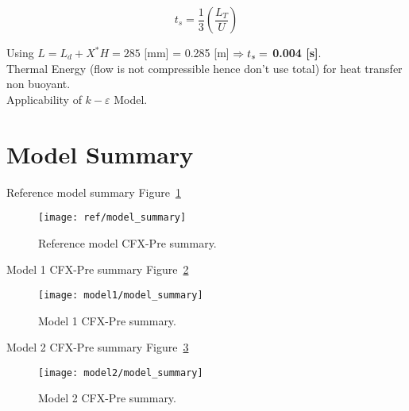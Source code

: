 \begin{equation}
	\label{eq:ts}
	t_s = \frac{1}{3} \left( \frac{L_T}{U} \right)
\end{equation}

Using $L = L_d + X^* H = 285$ [mm] = 0.285 [m] $\Rightarrow \boldmath{t_s =}$ \textbf{0.004 [s]}.\\  

Thermal Energy (flow is not compressible hence don't use total) for heat transfer non buoyant.\\


Applicability of $k-\varepsilon$ Model.


\section{Model Summary}
\label{sec:pre_summary}

Reference model summary Figure~\ref{fig:ref_modsum}
\begin{figure}[H]
	\centering
	\texttt{[image: ref/model\_summary]}
	\caption{Reference model CFX-Pre summary.}
	\label{fig:ref_modsum}
\end{figure}


Model 1 CFX-Pre summary Figure~\ref{fig:mod1_modsum}
\begin{figure}[H]
	\centering
	\texttt{[image: model1/model\_summary]}
	\caption{Model 1 CFX-Pre summary.}
	\label{fig:mod1_modsum}
\end{figure}


Model 2 CFX-Pre summary Figure~\ref{fig:mod2_modsum}
\begin{figure}[H]
	\centering
	\texttt{[image: model2/model\_summary]}
	\caption{Model 2 CFX-Pre summary.}
	\label{fig:mod2_modsum}
\end{figure}

